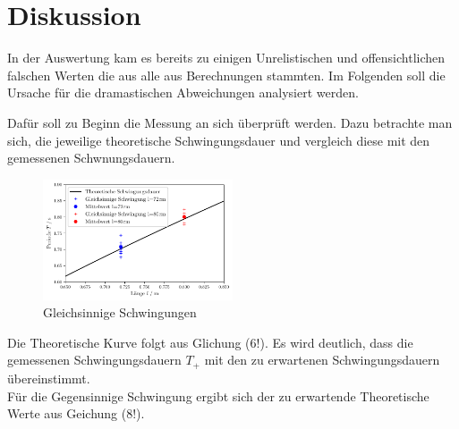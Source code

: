 \section{Diskussion}
\label{sec:Diskussion}

In der Auswertung kam es bereits zu einigen Unrelistischen und offensichtlichen
falschen Werten die aus alle aus Berechnungen stammten.
Im Folgenden soll die Ursache für die dramastischen Abweichungen analysiert werden.


Dafür soll zu Beginn die Messung an sich überprüft werden.
Dazu betrachte man sich, die jeweilige theoretische Schwingungsdauer und 
vergleich diese mit den gemessenen Schwnungsdauern.
\begin{figure}[H]
    \centering
    \includegraphics[width=0.5\textwidth]{plots/plot1.pdf}
    \caption{Gleichsinnige Schwingungen}
\end{figure}
Die Theoretische Kurve folgt aus Glichung (6!). Es wird deutlich, dass die gemessenen
Schwingungsdauern $T_+$ mit den zu erwartenen Schwingungsdauern übereinstimmt.\\

Für die Gegensinnige Schwingung ergibt sich der zu erwartende Theoretische Werte aus Geichung (8!).

